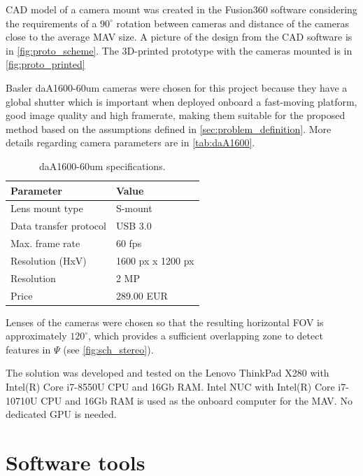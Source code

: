 CAD model of a camera mount was created in the Fusion360 software considering the requirements of a $90^\circ$ rotation between cameras and distance of the cameras close to the average MAV size.
A picture of the design from the CAD software is in \autoref{fig:proto_scheme}.
The 3D-printed prototype with the cameras mounted is in \autoref{fig:proto_printed}

Basler daA1600-60um cameras were chosen for this project because they have a global shutter which is important when deployed onboard a fast-moving platform, good image quality and high framerate, making them suitable for the proposed method based on the assumptions defined in \autoref{sec:problem_definition}. 
More details regarding camera parameters are in \autoref{tab:daA1600}.

\begin{table}
    \begin{center}
      \begin{tabular}{ l l }
      \hline
      Parameter              & Value             \\ \hline
      Lens mount type        & S-mount           \\
      Data transfer protocol & USB 3.0           \\
      Max. frame rate        & 60 fps            \\
      Resolution (HxV)       & 1600 px x 1200 px \\
      Resolution             & 2 MP              \\
      Price                  & 289.00 EUR        \\ \hline
      \end{tabular}
    \end{center}
    \caption{daA1600-60um specifications.}
    \label{tab:daA1600}
\end{table}

Lenses of the cameras were chosen so that the resulting horizontal FOV is approximately $120^\circ$, which provides a sufficient overlapping zone to detect features in $\Psi$ (see \autoref{fig:sch_stereo}).

The solution was developed and tested on the Lenovo ThinkPad X280 with Intel(R) Core i7-8550U CPU and 16Gb RAM.
Intel NUC with Intel(R) Core i7-10710U CPU and 16Gb RAM is used as the onboard computer for the MAV.
No dedicated GPU is needed.

\section{Software tools}
\label{sec:impl_software}

